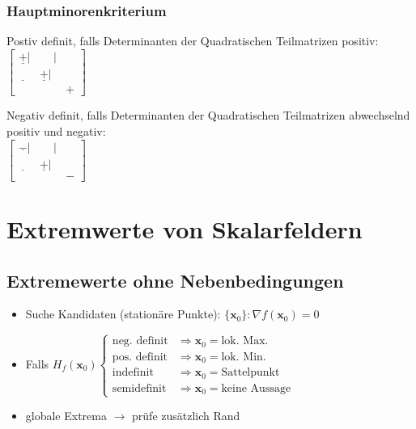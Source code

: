 \documentclass[6pt,a4paper]{scrartcl}
\newcommand{\eset}[1]{\ensuremath{\bigl\{#1\bigr\}}}                                            %
\newcommand{\mat}[1]{\ensuremath{\begin{bmatrix} #1 \end{bmatrix}}}                             %
\renewcommand{\vec}[1]{\ensuremath{\boldsymbol {#1}}}                                           %
\newcommand{\ra}[0]{\ensuremath{\rightarrow}}                                  %
\begin{document}
\begin{multicols*}{4}
    \subsubsection{Hauptminorenkriterium}

    \begin{minipage}[t]{0.48\linewidth}
        Postiv definit, falls Determinanten der Quadratischen Teilmatrizen positiv:\\
        $\mat{\underline{+}|&\phantom{+}|&\\\underline{\phantom{+}}&\underline{+}|&\\&&+}$
    \end{minipage}
    \hspace{.04\linewidth}
    \begin{minipage}[t]{0.48\linewidth}
        Negativ definit, falls Determinanten der Quadratischen Teilmatrizen abwechselnd positiv und negativ:\\
        $\mat{\underline{-}|&\phantom{+}|&\\\underline{\phantom{+}}&\underline{+}|&\\&&-}$
    \end{minipage}

    \section{Extremwerte von Skalarfeldern}
    \subsection{Extremewerte ohne Nebenbedingungen} %
    \begin{itemize} \itemsep0pt
        \item Suche Kandidaten (stationäre Punkte): $\eset{\vec x_0}:{\nabla f(\vec x_0) = 0}$
        \item Falls $H_f(\vec x_0) \begin{cases} \text{neg. definit} & \Rightarrow \vec x_0 = \text{lok. Max.} \\ \text{pos. definit} & \Rightarrow \vec x_0 = \text{lok. Min.} \\ \text{indefinit} & \Rightarrow \vec x_0 = \text{Sattelpunkt} \\ \text{semidefinit} & \Rightarrow \vec x_0 = \text{keine Aussage} \end{cases}$\\
        \item globale Extrema $\ra $ prüfe zusätzlich Rand
    \end{itemize}


\end{multicols*}
\end{document}
